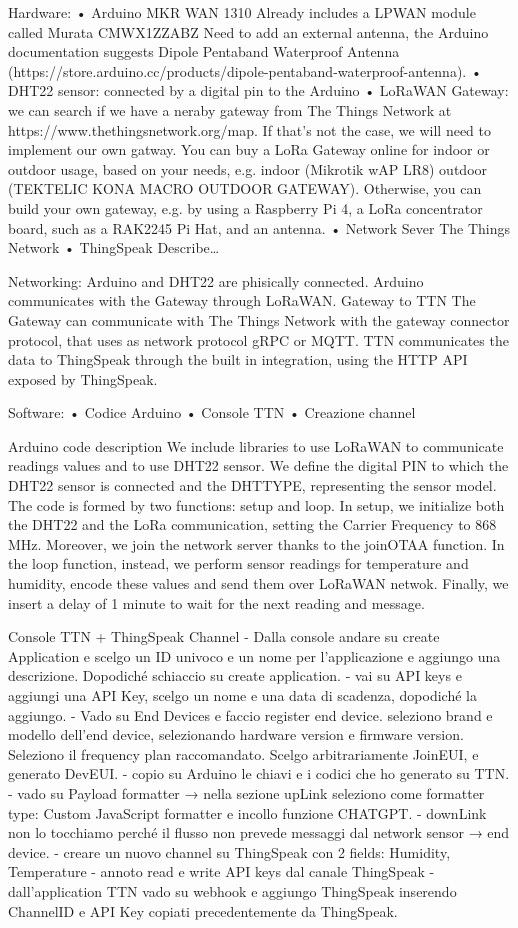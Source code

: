 Hardware:
•	Arduino MKR WAN 1310
Already includes a LPWAN module called Murata CMWX1ZZABZ
Need to add an external antenna, the Arduino documentation suggests Dipole Pentaband Waterproof Antenna (https://store.arduino.cc/products/dipole-pentaband-waterproof-antenna).
•	DHT22 sensor: connected by a digital pin to the Arduino
•	LoRaWAN Gateway: we can search if we have a neraby gateway from The Things Network at https://www.thethingsnetwork.org/map. If that’s not the case, we will need to implement our own gatway. 
You can buy a LoRa Gateway online for indoor or outdoor usage, based on your needs, e.g. indoor (Mikrotik wAP LR8) outdoor (TEKTELIC KONA MACRO OUTDOOR GATEWAY).
Otherwise, you can build your own gateway, e.g. by using a Raspberry Pi 4, a  LoRa concentrator board, such as a RAK2245 Pi Hat, and an antenna.
•	Network Sever The Things Network
•	ThingSpeak
Describe…

Networking:
Arduino and DHT22 are phisically connected.
Arduino communicates with the Gateway through LoRaWAN.
Gateway to TTN 
The Gateway can communicate with The Things Network with the gateway connector protocol, that uses as network protocol gRPC or MQTT.
TTN communicates the data to ThingSpeak through the built in integration, using the HTTP API exposed by ThingSpeak.

Software:
•	Codice Arduino 
•	Console TTN
•	Creazione channel 

Arduino code description 
We include libraries to use LoRaWAN to communicate readings values and to use DHT22 sensor. We define the digital PIN to which the DHT22 sensor is connected and the DHTTYPE, representing the sensor model.
The code is formed by two functions: setup and loop. In setup, we initialize both the DHT22 and the LoRa communication, setting the Carrier Frequency to 868 MHz. Moreover, we join the network server thanks to the joinOTAA function. In the loop function, instead, we perform sensor readings for temperature and humidity, encode these values and send them over LoRaWAN netwok. Finally, we insert a delay of 1 minute to wait for the next reading and message.
	 
Console TTN + ThingSpeak Channel
- Dalla console andare su create Application e scelgo un ID univoco e un nome per l’applicazione e aggiungo una descrizione. Dopodiché schiaccio su create application.
- vai su API keys e aggiungi una API Key, scelgo un nome e una data di scadenza, dopodiché la aggiungo.
- Vado su End Devices e faccio register end device.
seleziono brand e modello dell’end device, selezionando hardware version e firmware version.
Seleziono il frequency plan raccomandato.
Scelgo arbitrariamente JoinEUI, e generato DevEUI.
- copio su Arduino le chiavi e i codici che ho generato su TTN.
- vado su Payload formatter → nella sezione upLink seleziono come formatter type: Custom JavaScript formatter e incollo funzione CHATGPT.
- downLink non lo tocchiamo perché il flusso non prevede messaggi dal network sensor → end device.
- creare un nuovo channel su ThingSpeak con 2 fields: Humidity, Temperature
- annoto read e write API keys dal canale ThingSpeak
- dall’application TTN vado su webhook e aggiungo ThingSpeak inserendo ChannelID e API Key copiati precedentemente da ThingSpeak.

